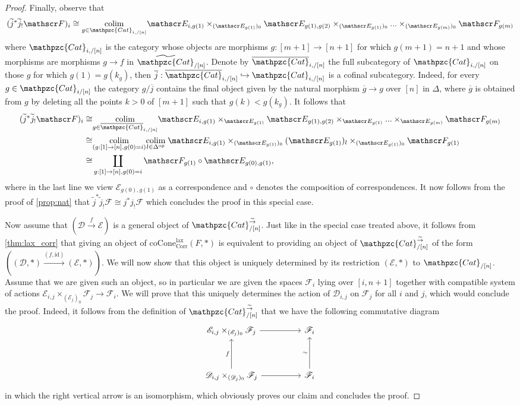 \documentclass[a4paper, reqno]{amsart}
\theoremstyle{definition}
\newcommand\cD{\mathscr D}
\newcommand\cE{\mathscr E}
\newcommand\cF{\mathscr F}
\newcommand\id{\mathrm{id}}
\newcommand\op{\mathrm{op}}
\newcommand\ccat{\mathpzc{Cat}}
\newcommand\colim{\mathrm{colim}}
\newcommand\corr{\mathrm{Corr}}
\newcommand\lax{\mathrm{lax}}
\newcommand\wrr{{\overset{\sim}{\rightarrow}}}
\newcommand\coc{\mathrm{coCone}}
\begin{document}
\begin{proof}
Finally, observe that 
\[(\widetilde{j}^*\widetilde{j}_!\cF)_i\cong\underset{g\in\ccat_{i,/[n]}}{\colim}\cE_{i,g(1)}\times_{(\cE_{g(1)})_0}\cE_{g(1),g(2)}\times_{(\cE_{g(1)})_0}...\times_{(\cE_{g(m)})_0}\cF_{g(m)}\]
where $\ccat_{i,/[n]}$ is the category whose objects are morphisms $g:[m+1]\rightarrow[n+1]$ for which $g(m+1)=n+1$ and whose morphisms are morphisms $g\rightarrow f$ in $\widetilde{\ccat}_{/[n]}$. Denote by $\overline{\ccat}_{i,/[n]}$ the full subcategory of $\ccat_{i,/[n]}$ on those $g$ for which $g(1)=g(k_g)$, then $\overline{j}:\overline{\ccat}_{i,/[n]}\hookrightarrow\ccat_{i,/[n]}$ is a cofinal subcategory. Indeed, for every $g\in\ccat_{i/[n]}$ the category $g/\overline{j}$ contains the final object given by the natural morphism $\overline{g}\rightarrow g$ over $[n]$ in $\Delta$, where $\overline{g}$ is obtained from $g$ by deleting all the points $k>0$ of $[m+1]$ such that $g(k)<g(k_g)$. It follows that
\begin{align*}
    (\widetilde{j}^*\widetilde{j}_!\cF)_i\cong&\underset{g\in\overline{\ccat}_{i,/[n]}}{\colim}\cE_{i,g(1)}\times_{\cE_{g(1)}}\cE_{g(1),g(2)}\times_{\cE_{g(1)}}...\times_{\cE_{g(m)}}\cF_{g(m)}\\
    \cong&\underset{(g:[1]\rightarrow[n], g(0)=i)}{\colim}\underset{l\in\Delta^\op}{\colim}\;\cE_{i,g(1)}\times_{(\cE_{g(1)})_0}(\cE_{g(1)})_l\times_{(\cE_{g(1)})_0}\cF_{g(1)}\\
    \cong&\coprod_{g:[1]\rightarrow[n],g(0)=i}\cF_{g(1)}\circ \cE_{g(0),g(1)},
\end{align*}
where in the last line we view $\cE_{g(0),g(1)}$ as a correspondence and $\circ$ denotes the composition of correspondences. It now follows from the proof of \cref{prop:nat} that $\widetilde{j}^*\widetilde{j}_!\cF\cong j^*j_!\cF$ which concludes the proof in this special case.\par
Now assume that $(\cD\xrightarrow{f}\cE)$ is a general object of $\ccat^\wrr_{/[n]}$. Just like in the special case treated above, it follows from \cref{thm:lax_corr} that giving an object of $\coc^\lax_\corr(F,*)$ is equivalent to providing an object of $\ccat^\wrr_{/[n]}$ of the form $((\cD,*)\xrightarrow{(f,\id)}(\cE,*))$. We will now show that this object is uniquely determined by its restriction $(\cE,*)$ to $\ccat_{/[n]}$. Assume that we are given such an object, so in particular we are given the spaces $\cF_i$ lying over $[i,n+1]$ together with compatible system of actions $\cE_{i,j}\times_{(\cE_j)_0}\cF_j\rightarrow\cF_i$. We will prove that this uniquely determines the action of $\cD_{i,j}$ on $\cF_j$ for all $i$ and $j$, which would conclude the proof. Indeed, it follows from the definition of $\ccat^\wrr_{/[n]}$ that we have the following commutative diagram
\[
\begin{tikzcd}[row sep=huge, column sep=huge]
\cE_{i,j}\times_{(\cE_j)_0}\cF_j\arrow[r]&\cF_i\\
\cD_{i,j}\times_{(\cD_j)_0}\cF_j\arrow[u, "f"]\arrow[r]&\cF_i\arrow[u, "\sim"]
\end{tikzcd}
\]
in which the right vertical arrow is an isomorphism, which obviously proves our claim and concludes the proof.
\end{proof}
\end{document}
